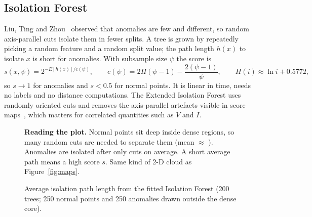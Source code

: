\documentclass[11pt,a4paper]{article}
\begin{document}
\subsection{Isolation Forest}
Liu, Ting and Zhou~\cite{iforest} observed that anomalies are few and different, so random axis-parallel
cuts isolate them in fewer splits. A tree is grown by repeatedly picking a random feature and a random split
value; the path length $h(x)$ to isolate $x$ is short for anomalies. With subsample size $\psi$ the score is
\begin{equation}
  s(x,\psi)=2^{-E[h(x)]/c(\psi)},\qquad c(\psi)=2H(\psi-1)-\frac{2(\psi-1)}{\psi},\qquad H(i)\approx\ln i+0.5772,
\end{equation}
so $s\to1$ for anomalies and $s<0.5$ for normal points. It is linear in time, needs no labels and no distance
computations. The Extended Isolation Forest uses randomly oriented cuts and removes the axis-parallel
artefacts visible in score maps~\cite{eif}, which matters for correlated quantities such as $V$ and $I$.

\begin{figure}[H]
\centering
\begin{minipage}{0.6\textwidth}
\centering
{}
\end{minipage}\hfill
\begin{minipage}{0.36\textwidth}
\small\textbf{Reading the plot.} Normal points sit deep inside dense regions, so many random cuts are
needed to separate them (mean $\approx$ \pathNormal). Anomalies are isolated after only \pathAnom{} cuts on
average. A short average path means a high score $s$. Same kind of 2-D cloud as Figure~\ref{fig:maps}.
\end{minipage}
\caption{Average isolation path length from the fitted Isolation Forest (200 trees; 250 normal points and
250 anomalies drawn outside the dense core).}
\label{fig:pathlen}
\end{figure}
\end{document}
